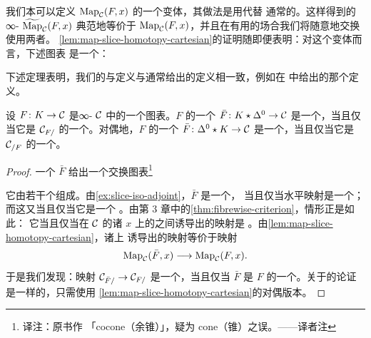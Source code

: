 \begin{remark}\label{rem:fat-join-variant}
我们本可以定义 $\mathrm{Map}_{\mathcal{C}}(F, x)$ 的一个变体，其做法是用\trFatJoin{}代替
通常的\trJoin{}。这样得到的∞-\trGroupoid{} $\widetilde{\mathrm{Map}}_{\mathcal{C}}(F, x)$
典范地等价于 $\mathrm{Map}_{\mathcal{C}}(F, x)$，并且在有用的场合我们将随意地交换使用两者。
\cref{lem:map-slice-homotopy-cartesian}的证明随即便表明：对这个变体而言，下述图表
是一个\trPullback{}：
\begin{center}
\end{center}
\end{remark}

下述定理表明，我们的\trLimit{}与\trColimit{}定义与通常给出的定义相一致，例如在
\cite{Lur09} 中给出的那个定义。

\begin{theorem}\label{thm:colimit-cone-initial}
设 $F\colon K \to \mathcal{C}$ 是∞-\trCategory{} $\mathcal{C}$ 中的一个图表。$F$ 的一个\trCone{}%
$\bar{F}\colon K \star \Delta^0 \to \mathcal{C}$ 是一个\trColimit{}\trCone{}，当且仅当它是
$\mathcal{C}_{F/}$ 的一个\trInitialObject{}。对偶地，$F$ 的一个\trCocone{}%
$\bar{F}\colon \Delta^0 \star K \to \mathcal{C}$ 是一个\trLimit{}\trCocone{}，当且仅当它是
$\mathcal{C}_{/F}$ 的一个\trTerminalObject{}。
\end{theorem}

\begin{proof}
一个\trCocone{} $\bar{F}$ 给出一个交换图表\footnote{译注：原书作
「cocone（余锥）」，疑为 cone（锥）之误。——译者注}
\begin{center}
\end{center}
它由若干个\trLeftFibration{}组成。由\cref{ex:slice-iso-adjoint}，$\bar{F}$ 是一个\trInitialObject{}，
当且仅当水平映射是一个\trTrivialFibration{}；而这又当且仅当它是一个%
\trJoyalEquivalence{}。由第 3 章中的\cref{thm:fibrewise-criterion}，情形正是如此：
它当且仅当在 $\mathcal{C}$ 的诸\trObject{} $x$ 上的\trFibre{}之间诱导出的映射是%
\trHomotopyEquivalence{}。由\cref{lem:map-slice-homotopy-cartesian}，诸\trFibre{}上
诱导出的映射等价于映射
\[
\mathrm{Map}_{\mathcal{C}}(\bar{F}, x) \longrightarrow \mathrm{Map}_{\mathcal{C}}(F, x).
\]
于是我们发现：映射 $\mathcal{C}_{\bar{F}/} \to \mathcal{C}_{F/}$ 是一个\trJoyalEquivalence{}，当且仅当
$\bar{F}$ 是 $F$ 的一个\trColimit{}\trCone{}。关于\trLimit{}的论证是一样的，只需使用%
\cref{lem:map-slice-homotopy-cartesian}的对偶版本。
\end{proof}

